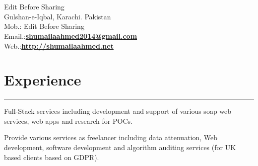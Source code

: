 \documentclass[]{ShumailaAhmed-Resume}
\begin{document}
\hfill
\begin{minipage}[t]{0.66\textwidth} 
\hspace*{0pt}\hfill    \\
\hspace*{0pt}\hfill    \\
\hspace*{0pt}\hfill Edit Before Sharing\\
\hspace*{0pt}\hfill Gulshan-e-Iqbal, Karachi. Pakistan\\
\hspace*{0pt}\hfill Mob.: Edit Before Sharing \\
\hspace*{0pt}\hfill Email.:\textbf{\href{mailto:shumailaahmed2014@gmail.com}{shumailaahmed2014@gmail.com}} \\
\hspace*{0pt}\hfill Web.:\textbf{\href{http://shumailaahmed.net}{http://shumailaahmed.net}} 
\section{Experience}
\noindent\rule{12.5cm}{0.4pt}
 
\noindent
\hspace{5em}%
\begin{minipage}{0.85\textwidth\vspace{2pt}}
Full-Stack services including development and support of various soap web services, web apps and research for POCs.\\
\end{minipage}

\sectionsep

 
\descript{ }
\noindent
\hspace{5em}%
\begin{minipage}{0.85\textwidth\vspace{2pt}}
Provide various services as freelancer including data attenuation, Web development, software development and algorithm auditing services (for UK based clients based on GDPR).
\end{minipage}
\sectionsep


\end{minipage}
\end{document}
